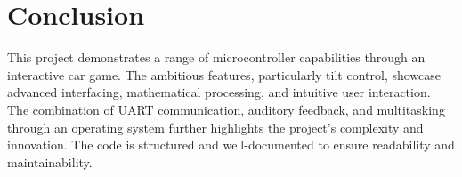 \documentclass[conference]{IEEEtran}
\begin{document}
\section{Conclusion}
This project demonstrates a range of microcontroller capabilities through an interactive car game. The ambitious features, particularly tilt control, showcase advanced interfacing, mathematical processing, and intuitive user interaction. The combination of UART communication, auditory feedback, and multitasking through an operating system further highlights the project’s complexity and innovation. The code is structured and well-documented to ensure readability and maintainability.
\end{document}
